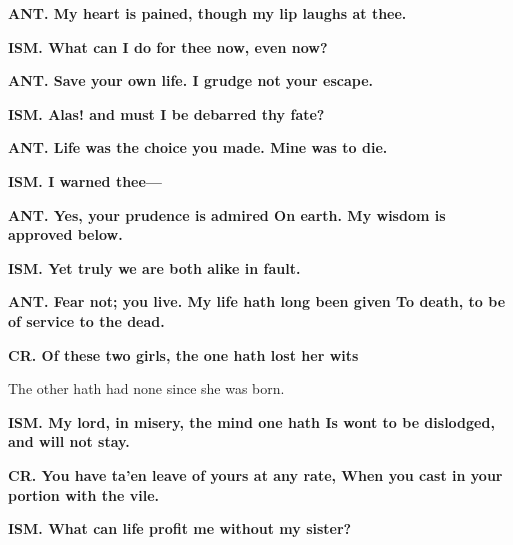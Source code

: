 \documentclass[11pt,letter]{book}
\begin{document}
\par \textbf{ANT. My heart is pained, though my lip laughs at thee.}
\par 

\par \textbf{ISM. What can I do for thee now, even now?}
\par 

\par \textbf{ANT. Save your own life. I grudge not your escape.}
\par 

\par \textbf{ISM. Alas! and must I be debarred thy fate?}
\par 

\par \textbf{ANT. Life was the choice you made. Mine was to die.}
\par 

\par \textbf{ISM. I warned thee—}
\par 

\par \textbf{ANT. Yes, your prudence is admired On earth. My wisdom is approved below.}
\par 

\par \textbf{ISM. Yet truly we are both alike in fault.}
\par 

\par \textbf{ANT. Fear not; you live. My life hath long been given To death, to be of service to the dead.}
\par 

\par \textbf{CR. Of these two girls, the one hath lost her wits}
\par   The other hath had none since she was born.

\par \textbf{ISM. My lord, in misery, the mind one hath Is wont to be dislodged, and will not stay.}
\par 

\par \textbf{CR. You have ta’en leave of yours at any rate, When you cast in your portion with the vile.}
\par 

\par \textbf{ISM. What can life profit me without my sister?}
\par 
\end{document}
